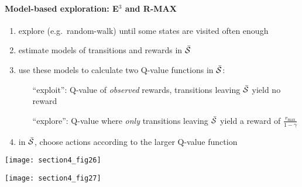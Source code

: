 	{\hfill \footnotesize \citep[2-armed bandit task from][]{Sutton98}}

\paragraph{Model-based exploration: E$^3$ and R-MAX}
	\begin{enumerate}
		\vspace{-1mm}
		\item explore (e.g.~random-walk) until some states are visited often enough 
		\vspace{1.5mm}
		\item estimate models of transitions and rewards in $\bar{\mathcal{S}}$
		\vspace{1.5mm}
		\item use these models to calculate 
			two Q-value functions in $\bar{\mathcal{S}}$:
			\begin{itemize}
				\item[``exploit'':] Q-value of {\em observed} rewards,
					transitions leaving $\bar{\mathcal{S}}$ yield no reward
				\vspace{0mm}
				\item[``explore'':] Q-value where {\em only}
					transitions leaving $\bar{\mathcal{S}}$ 
					yield a reward of $\frac{r_\text{max}}{1-\gamma}$
			\end{itemize}
		\vspace{1mm}
		\item in $\bar{\mathcal{S}}$, choose actions according 
			to the larger Q-value function
	\end{enumerate}
	
	\vspace{2mm}
	\begin{minipage}{12.5cm}
		\hspace{4mm}
		\begin{minipage}{2.1cm}
			\texttt{[image: section4\_fig26]}
		\end{minipage}
		\hspace{2mm}
		\begin{minipage}{8.5cm}
			\texttt{[image: section4\_fig27]}
		\end{minipage}
	\end{minipage}
	
